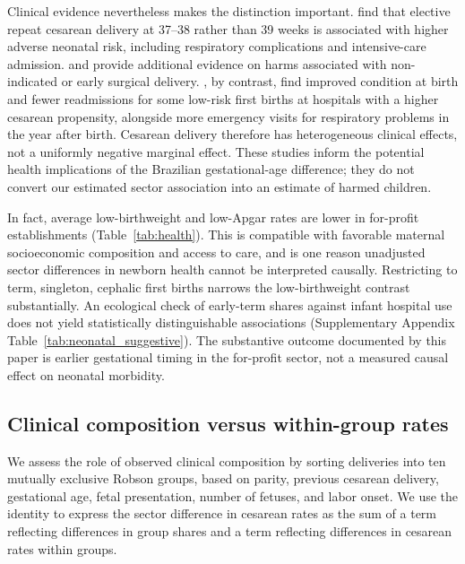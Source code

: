 \documentclass[12pt]{article}
\newcommand{\satab}[1]{Supplementary Appendix Table~\ref{#1}}
\begin{document}
Clinical evidence nevertheless makes the distinction important. \citet{tita2009} find that elective repeat cesarean delivery at 37--38 rather than 39 weeks is associated with higher adverse neonatal risk, including respiratory complications and intensive-care admission. \citet{costaramon2018} and \citet{borra2019} provide additional evidence on harms associated with non-indicated or early surgical delivery. \citet{card2023}, by contrast, find improved condition at birth and fewer readmissions for some low-risk first births at hospitals with a higher cesarean propensity, alongside more emergency visits for respiratory problems in the year after birth. Cesarean delivery therefore has heterogeneous clinical effects, not a uniformly negative marginal effect. These studies inform the potential health implications of the Brazilian gestational-age difference; they do not convert our estimated sector association into an estimate of harmed children.

In fact, average low-birthweight and low-Apgar rates are lower in for-profit establishments (Table~\ref{tab:health}). This is compatible with favorable maternal socioeconomic composition and access to care, and is one reason unadjusted sector differences in newborn health cannot be interpreted causally. Restricting to term, singleton, cephalic first births narrows the low-birthweight contrast substantially. An ecological check of early-term shares against infant hospital use does not yield statistically distinguishable associations (\satab{tab:neonatal_suggestive}). The substantive outcome documented by this paper is earlier gestational timing in the for-profit sector, not a measured causal effect on neonatal morbidity.



\subsection{Clinical composition versus within-group rates}

We assess the role of observed clinical composition by sorting deliveries into ten mutually exclusive Robson groups, based on parity, previous cesarean delivery, gestational age, fetal presentation, number of fetuses, and labor onset. We use the \citet{kitagawa1955} identity to express the sector difference in cesarean rates as the sum of a term reflecting differences in group shares and a term reflecting differences in cesarean rates within groups.
\end{document}
